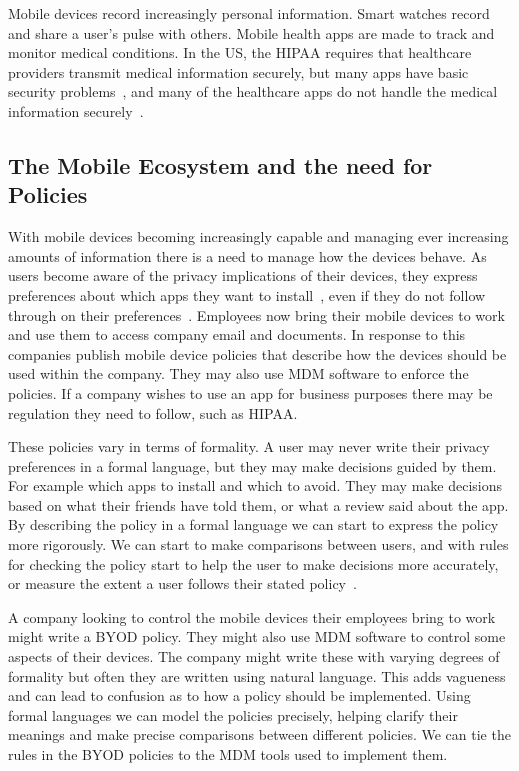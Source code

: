 \documentclass[thesis.tex]{subfiles}
\begin{document}
Mobile devices record increasingly personal information.  Smart
watches record and share a user's pulse with others. Mobile health
apps are made to track and monitor medical conditions. In the US, the
\ac{HIPAA} requires that healthcare providers transmit medical
information securely, but many apps have basic security
problems~\cite{fahl_why_2012}, and many of the healthcare apps do not
handle the medical information securely~\cite{knorr_privacy_2015}.

\subsection{The Mobile Ecosystem and the need for Policies}

With mobile devices becoming increasingly capable and managing ever
increasing amounts of information there is a need to manage how the
devices behave.  As users become aware of the privacy implications of
their devices, they express preferences about which apps they want to
install~\cite{sadeh_understanding_2009}, even if they do not follow
through on their preferences~\cite{hallett_apppal_2016}.  Employees
now bring their mobile devices to work and use them to access company
email and documents.  In response to this companies publish mobile
device policies that describe how the devices should be used within
the company.  They may also use \ac{MDM} software to enforce the
policies.  If a company wishes to use an app for business purposes
there may be regulation they need to follow, such as \ac{HIPAA}.

These policies vary in terms of formality.  A user may never write
their privacy preferences in a formal language, but they may make
decisions guided by them.  For example which apps to install and which
to avoid.  They may make decisions based on what their friends have
told them, or what a review said about the app.  By describing the
policy in a formal language we can start to express the policy more
rigorously.  We can start to make comparisons between users, and with
rules for checking the policy start to help the user to make decisions
more accurately, or measure the extent a user follows their stated
policy~\cite{hallett_apppal_2016}.  

A company looking to control the mobile devices their employees bring
to work might write a \ac{BYOD} policy.  They might also use \ac{MDM}
software to control some aspects of their devices.  The company might
write these with varying degrees of formality but often they are
written using natural language.  This adds vagueness and can lead to
confusion as to how a policy should be implemented.  Using formal
languages we can model the policies precisely, helping clarify their
meanings and make precise comparisons between different policies.  We
can tie the rules in the \ac{BYOD} policies to the \ac{MDM} tools used
to implement them.
\end{document}
